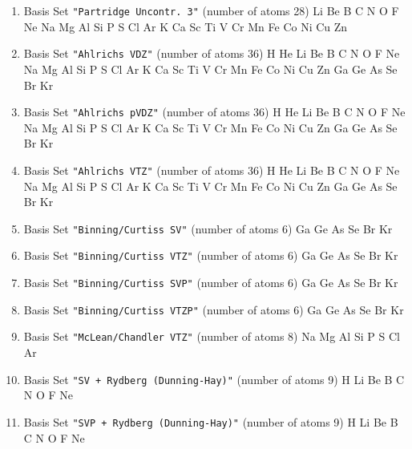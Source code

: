 \begin{enumerate}
\item Basis Set \verb#"Partridge Uncontr. 3"# (number of atoms 28)  \newline 
  Li Be B C N O F Ne Na Mg Al Si P S Cl Ar K Ca Sc Ti V Cr Mn Fe Co
 Ni Cu Zn


\item Basis Set \verb#"Ahlrichs VDZ"# (number of atoms 36)  \newline 
  H He Li Be B C N O F Ne Na Mg Al Si P S Cl Ar K Ca Sc Ti V Cr Mn
 Fe Co Ni Cu Zn Ga Ge As Se Br Kr


\item Basis Set \verb#"Ahlrichs pVDZ"# (number of atoms 36)  \newline 
  H He Li Be B C N O F Ne Na Mg Al Si P S Cl Ar K Ca Sc Ti V Cr Mn
 Fe Co Ni Cu Zn Ga Ge As Se Br Kr


\item Basis Set \verb#"Ahlrichs VTZ"# (number of atoms 36)  \newline 
  H He Li Be B C N O F Ne Na Mg Al Si P S Cl Ar K Ca Sc Ti V Cr Mn
 Fe Co Ni Cu Zn Ga Ge As Se Br Kr


\item Basis Set \verb#"Binning/Curtiss SV"# (number of atoms 6)  \newline 
  Ga Ge As Se Br Kr


\item Basis Set \verb#"Binning/Curtiss VTZ"# (number of atoms 6)  \newline 
  Ga Ge As Se Br Kr


\item Basis Set \verb#"Binning/Curtiss SVP"# (number of atoms 6)  \newline 
  Ga Ge As Se Br Kr


\item Basis Set \verb#"Binning/Curtiss VTZP"# (number of atoms 6)  \newline 
  Ga Ge As Se Br Kr


\item Basis Set \verb#"McLean/Chandler VTZ"# (number of atoms 8)  \newline 
  Na Mg Al Si P S Cl Ar


\item Basis Set \verb#"SV + Rydberg (Dunning-Hay)"# (number of atoms 9)  \newline 
  H Li Be B C N O F Ne


\item Basis Set \verb#"SVP + Rydberg (Dunning-Hay)"# (number of atoms 9)  \newline 
  H Li Be B C N O F Ne



\end{enumerate}
